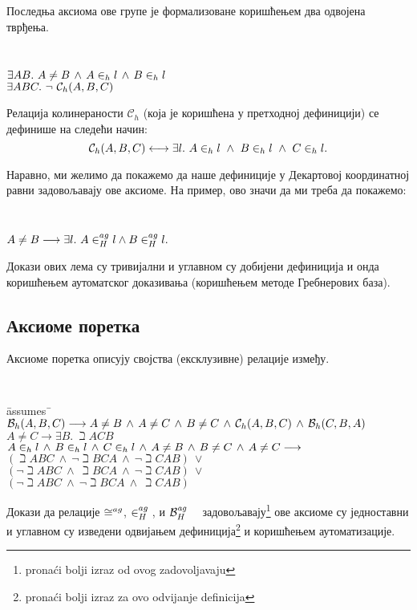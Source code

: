 Последња аксиома ове групе је формализоване коришћењем два одвојена
тврђења.
{\tt
\begin{tabbing}
$\exists A B.\ A \neq B \,\wedge\,A \in_h l \,\wedge\, B \in_h l$\\
$\exists A B C.\ \neg\ \colinh{A}{B}{C}$
\end{tabbing}
}
\noindent Релација колинераности $\mathcal{C}_h$ (која је коришћена у
претходној дефиницији) се дефинише на следећи начин:
$$\mathcal{C}_h(A, B, C) \longleftrightarrow \exists
l.\ A \in_h l\ \wedge\ B \in_h l\ \wedge \ C \in_h l.$$

Наравно, ми желимо да покажемо да наше дефиниције у Декартовој
координатној равни задовољавају ове аксиоме. На пример, ово значи да
ми треба да покажемо:

\vspace{-3mm}
{\tt
\begin{tabbing}
$A \neq B \longrightarrow \exists l.\ \aginh{A}{l} \wedge
\aginh{B}{l}.$
\end{tabbing}
}

Докази ових лема су тривијални и углавном су добијени дефиниција и
онда коришћењем аутоматског доказивања (коришћењем методе Гребнерових
база).

\subsection{Аксиоме поретка}
Аксиоме поретка описују својства (ексклузивне) релације између.
{\tt
\begin{tabbing}
\hspace{5mm}\=assumes\ \=\kill
$\mathcal{B}_h(A, B, C) \longrightarrow A \neq B\,\wedge\,A \neq C\,\wedge\,B \neq C\,\wedge\,\mathcal{C}_h(A, B, C)\,\wedge\,\mathcal{B}_h(C, B, A)$\\
$A \neq C \longrightarrow \exists B.\ \beth{A}{C}{B}$\\
$A \in_h l\,\wedge\,B \in_h l\,\wedge\, C \in_h l\,\wedge\,A \neq B\,\wedge\,B \neq C\,\wedge\,A \neq C \longrightarrow$\\
\> $(\beth{A}{B}{C}\ \wedge\ \neg \beth{B}{C}{A}\ \wedge\ \neg \beth{C}{A}{B}) \ \vee$ \\
\> $(\neg\beth{A}{B}{C}\ \wedge\ \beth{B}{C}{A}\ \wedge\  \neg \beth{C}{A}{B}) \ \vee$\\
\>$(\neg\beth{A}{B}{C}\ \wedge\ \neg \beth{B}{C}{A}\ \wedge\ \beth{C}{A}{B})$
\end{tabbing}
}

Докази да релације $\agcongr{}{}{}$, $ \in^{ag}_H {}$, и $\mathcal{B}_H^{\mathit{ag}}\ \ \ $
задовољавају\footnote{prona\'ci bolji izraz od ovog zadovoljavaju} ове
аксиоме су једноставни и углавном су изведени одвијањем
дефиниција\footnote{prona\'ci bolji izraz za ovo odvijanje definicija}
и коришћењем аутоматизације.

